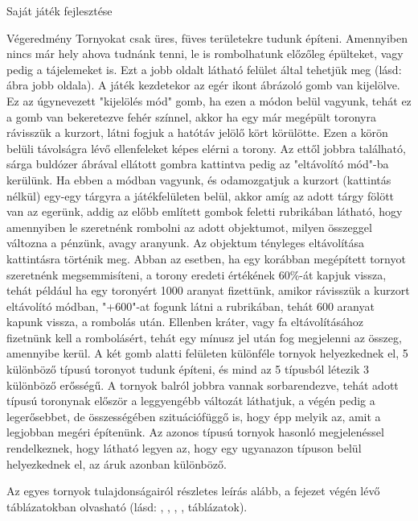 \begin{MyChapter}{Saját játék fejlesztése}
\begin{MySection}{Végeredmény}
		Tornyokat csak üres, füves területekre tudunk építeni. Amennyiben nincs már hely ahova tudnánk tenni, le is rombolhatunk előzőleg épülteket, vagy pedig a tájelemeket is. Ezt a jobb oldalt látható felület által tehetjük meg (lásd:  ábra jobb oldala).		
		A játék kezdetekor az egér ikont ábrázoló gomb van kijelölve. Ez az úgynevezett "kijelölés mód" gomb, ha ezen a módon belül vagyunk, tehát ez a gomb van bekeretezve fehér színnel, akkor ha egy már megépült toronyra rávisszük a kurzort, látni fogjuk a hatótáv jelölő kört körülötte. Ezen a körön belüli távolságra lévő ellenfeleket képes elérni a torony. %
		Az ettől jobbra található, sárga buldózer ábrával ellátott gombra kattintva pedig az "eltávolító mód"-ba kerülünk. Ha ebben a módban vagyunk, és odamozgatjuk a kurzort (kattintás nélkül) egy-egy tárgyra a játékfelületen belül, akkor amíg az adott tárgy fölött van az egerünk, addig az előbb említett gombok feletti rubrikában látható, hogy amennyiben le szeretnénk rombolni az adott objektumot, milyen összeggel változna a pénzünk, avagy aranyunk. Az objektum tényleges eltávolítása kattintásra történik meg.
		Abban az esetben, ha egy korábban megépített tornyot szeretnénk megsemmisíteni, a torony eredeti értékének 60\%-át kapjuk vissza, tehát például ha egy toronyért 1000 aranyat fizettünk, amikor rávisszük a kurzort eltávolító módban, "+600"-at fogunk látni a rubrikában, tehát 600 aranyat kapunk vissza, a rombolás után. Ellenben kráter, vagy fa eltávolításához fizetnünk kell a rombolásért, tehát egy mínusz jel után fog megjelenni az összeg, amennyibe kerül.
		A két gomb alatti felületen különféle tornyok helyezkednek el, 5 különböző típusú toronyot tudunk építeni, és mind az 5 típusból létezik 3 különböző erősségű.
		A tornyok balról jobbra vannak sorbarendezve, tehát adott típusú toronynak először a leggyengébb változát láthatjuk, a végén pedig a legerősebbet, de összességében szituációfüggő is, hogy épp melyik az, amit a legjobban megéri építenünk. Az azonos típusú tornyok hasonló megjelenéssel rendelkeznek, hogy látható legyen az, hogy egy ugyanazon típuson belül helyezkednek el, az áruk azonban különböző.
		
		Az egyes tornyok tulajdonságairól részletes leírás alább, a fejezet végén lévő táblázatokban olvasható (lásd: , , , ,  táblázatok).
		

\end{MySection}
\end{MyChapter}

